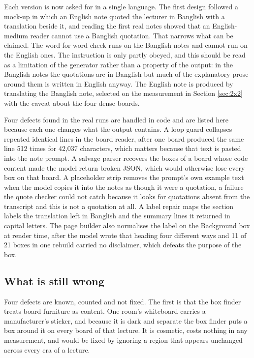 Each version is now asked for in a single language. The first design followed
a mock-up in which an English note quoted the lecturer in Banglish with a translation
beside it, and reading the first real notes showed that an English-medium reader cannot
use a Banglish quotation. That narrows what can be claimed. The word-for-word check runs on the Banglish notes and cannot run on the
English ones. The instruction is only partly obeyed, and this should be read as a
limitation of the generator rather than a property of the output: in the Banglish notes
the quotations are in Banglish but much of the explanatory prose around them is written
in English anyway. The English note is produced by translating the Banglish note, selected on
the measurement in Section \ref{sec:2x2} with the caveat about the four dense boards.

Four defects found in the real runs are handled in code and are listed here because each
one changes what the output contains. A loop guard collapses repeated identical lines in
the board reader, after one board produced the same line 512 times for 42,037 characters,
which matters because that text is pasted into the note prompt. A salvage parser recovers
the boxes of a board whose code content made the model return broken JSON, which would
otherwise lose every box on that board. A placeholder strip removes the prompt's own
example text when the model copies it into the notes as though it were a quotation, a
failure the quote checker could not catch because it looks for quotations absent from the
transcript and this is not a quotation at all. A label repair maps the section labels the
translation left in Banglish and the summary lines it returned in capital letters. The
page builder also normalises the label on the Background box at render time, after the
model wrote that heading four different ways and 11 of 21 boxes in one rebuild carried no
disclaimer, which defeats the purpose of the box.

\subsection{What is still wrong}
\label{sec:known-defects}

Four defects are known, counted and not fixed. The first is that the box finder treats
board furniture as content. One room's whiteboard carries a
manufacturer's sticker, and because it is dark and separate the box finder puts a box
around it on every board of that lecture. It is cosmetic, costs nothing in any
measurement, and would be fixed by ignoring a region that appears unchanged across every
era of a lecture.

